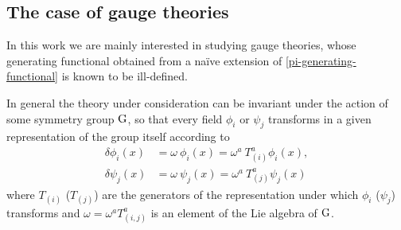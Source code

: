 


\subsection{The case of gauge theories}

In this work we are mainly interested in studying gauge theories, whose  generating functional obtained from a na\"ive extension of \eqref{pi-generating-functional} is known to be ill-defined.

In general the theory under consideration can be invariant under the action of some symmetry group ${ \text{G} }$, so that every field $\phi_i$ or $\psi_j$ transforms in a given representation of the group itself according to
\begin{equation}\label{group-transformation}
\begin{split}
\delta \phi_i(x) & = \omega\: \phi_i(x)= \omega^a \: T_{(i)}^a \phi_i(x),
\\
\delta \psi_j(x) & = \omega\: \psi_j(x)= \omega^a \: T_{(j)}^a \psi_j(x)
\end{split}
\end{equation}
where $T_{(i)}$ ($T_{(j)}$) are the generators of the representation under which $\phi_i$ ($\psi_j$) transforms and $\omega = \omega^a T^a_{(i,j)}$ is an element of the Lie algebra of ${ \text{G} }$. 


